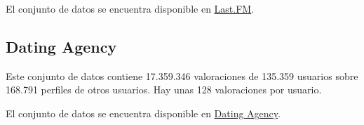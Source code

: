 El conjunto de datos se encuentra disponible en \href{http://files.grouplens.org/datasets/hetrec2011/hetrec2011-lastfm-2k.zip}{Last.FM}.

\subsection{Dating Agency}\label{dating-agency}
Este conjunto de datos \cite{brozovsky07recommender} contiene 17.359.346 valoraciones de 135.359 usuarios sobre 168.791 perfiles de otros usuarios. Hay unas 128 valoraciones por usuario.

El conjunto de datos se encuentra disponible en \href{http://www.occamslab.com/petricek/data/libimseti-complete.zip}{Dating Agency}.